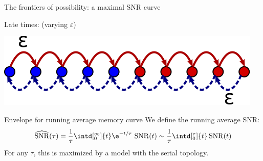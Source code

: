 \documentclass[final,hyperref={pdfpagelabels=false,bookmarks=false}]{beamer}
\DeclareMathOperator{\SNR}{SNR}
\begin{document}
\begin{frame}{}
\begin{columns}[t]
\begin{column}{0.33\linewidth}
\begin{block}{The frontiers of possibility: a maximal SNR curve}
{   %
   \vp Late times: (varying $\varepsilon$)
   \begin{center}
     \includegraphics[width=0.7\linewidth]{multistate_sticky.svg}
   \end{center}
}
%
\end{block}


\begin{block}{Envelope for running average memory curve}
%
 We define the running average SNR:
 \begin{equation*}
   \widehat{\SNR}(\tau) = \frac{1}{\tau}\intd[_0^\infty]{t}\e^{-t/\tau}\,\SNR(t)
     \sim \frac{1}{\tau}\intd[_0^\tau]{t}\SNR(t)
 \end{equation*}
 For any $\tau$, this is maximized by a model with the serial topology.


\end{block}
\end{column}
\end{columns}
\end{frame}
\end{document}
